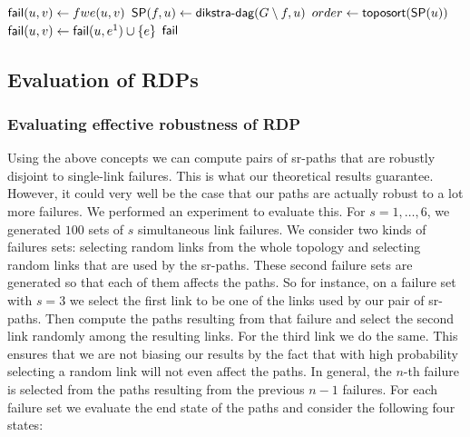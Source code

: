 \begin{algorithm}[t]
\small
\caption{$\textsf{precompute-failEdges}\left( G, \sp, fwe \right)$}
\begin{algorithmic}[1]
  \STATE $\fail(u, v) \gets fwe(u, v)$
\ENDFOR
{}
      \STATE $\sp(f, u) \gets \textsf{dikstra-dag}(G \setminus f, u)$
      \STATE $order \gets \textsf{toposort}(\sp(u))$
	  \STATE $\fail(u, v) \gets \fail(u, e^1) \cup \{ e \}$
	\ENDFOR
      \ENDFOR
    \ENDIF
  \ENDFOR
\ENDFOR
\RETURN $\fail$
\end{algorithmic}
\label{algo:prefail}
\end{algorithm}

\subsection{Evaluation of RDPs}

\subsubsection{Evaluating effective robustness of RDP}

Using the above concepts we can compute pairs of sr-paths that are robustly disjoint to single-link failures.
This is what our theoretical results guarantee. However, it could very well be the case that our paths are actually
robust to a lot more failures. We performed an experiment to evaluate this. For $s = 1, \ldots, 6$, we
generated $100$ sets of $s$ simultaneous link failures. We consider two kinds of failures sets: selecting random
links from the whole topology and selecting random links that are used by the sr-paths.
These second failure sets are generated so that each of them
affects the paths. So for instance, on a failure set with $s = 3$ we select the first link to be one of
the links used by our pair of sr-paths. Then compute the paths resulting from that failure and select the second
link randomly among the resulting links. For the third link we do the same. This ensures that we are not biasing our
results by the fact that with high probability selecting a random link will not even affect the paths. In general,
the $n$-th failure is selected from the paths resulting from the previous $n - 1$ failures. For each failure set
we evaluate the end state of the paths and consider the following four states:

